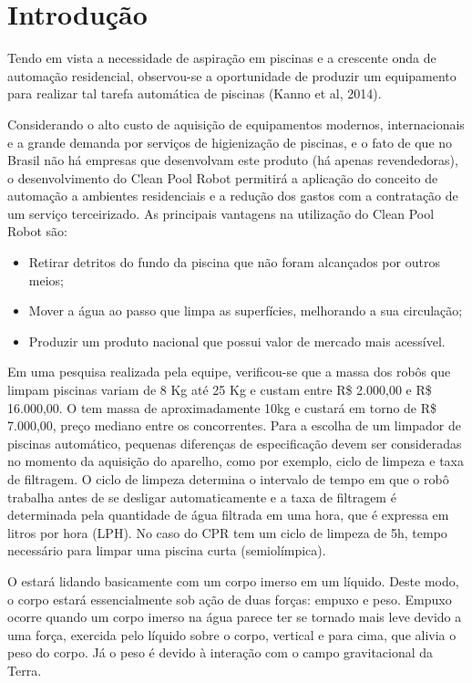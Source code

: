 \chapter{Introdução}
Tendo em vista a necessidade de aspiração em piscinas e a crescente onda de automação residencial, observou-se a oportunidade de produzir um equipamento para realizar tal tarefa automática de piscinas (Kanno et al, 2014).

Considerando o alto custo de aquisição de equipamentos modernos, internacionais e a grande demanda por serviços de higienização de piscinas, e o fato de que no Brasil não há empresas que desenvolvam este produto (há apenas revendedoras), o desenvolvimento do Clean Pool Robot permitirá a aplicação do conceito de automação a ambientes residenciais e a redução dos gastos com a contratação de um serviço terceirizado. As principais vantagens na utilização do Clean Pool Robot são:

\begin{itemize}
\item Retirar detritos do fundo da piscina que não foram alcançados por outros meios;
\item Mover a água ao passo que limpa as superfícies, melhorando a sua circulação;
\item Produzir um produto nacional que possui valor de mercado mais acessível.
\end{itemize}

Em uma pesquisa realizada pela equipe, verificou-se que a massa dos robôs que limpam piscinas variam de 8 Kg até 25 Kg e custam entre R\$ 2.000,00 e R\$ 16.000,00. O \cpr tem massa de aproximadamente 10kg e custará em torno de R\$ 7.000,00, preço mediano entre os concorrentes. Para a escolha de um limpador de piscinas automático, pequenas diferenças de especificação devem ser consideradas no momento da aquisição do aparelho, como por exemplo, ciclo de limpeza e taxa de filtragem. O ciclo de limpeza determina o intervalo de tempo em que o robô trabalha antes de se desligar automaticamente e a taxa de filtragem é determinada pela quantidade de água filtrada em uma hora, que é expressa em litros por hora (LPH). No caso do CPR tem um ciclo de limpeza de 5h, tempo necessário para limpar uma piscina curta (semiolímpica).

O \cpr estará lidando basicamente com um corpo imerso em um líquido. Deste modo, o corpo estará essencialmente sob ação de duas forças: empuxo e peso.  Empuxo ocorre quando um corpo imerso na água parece ter se tornado mais leve devido a uma força, exercida pelo líquido sobre o corpo, vertical e para cima, que alivia o peso do corpo. Já o peso é devido à interação com o campo gravitacional da Terra.

